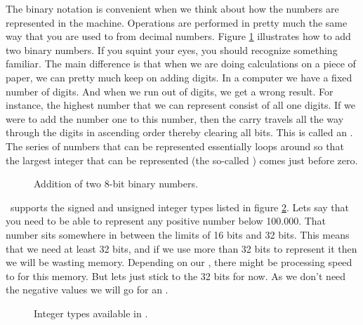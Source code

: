 
The binary notation is convenient when we think about how the numbers are represented in the machine. Operations are performed in pretty much the same way that you are used to from decimal numbers. Figure \ref{fig:prim:int:binary:add} illustrates how to add two binary numbers. If you squint your eyes, you should recognize something familiar. The main difference is that when we are doing calculations on a piece of paper, we can pretty much keep on adding digits. In a computer we have a fixed number of digits. And when we run out of digits, we get a wrong result. For instance, the highest number that we can represent consist of all one digits. If we were to add the number one to this number, then the carry travels all the way through the digits in ascending order thereby clearing all bits. This is called an . The series of numbers that can be represented essentially loops around so that the largest integer that can be represented (the so-called ) comes just before zero.

\begin{figure}[tbp]
  
  \caption{Addition of two 8-bit binary numbers.}
  \label{fig:prim:int:binary:add}
\end{figure}


\csharpsubsection{\csharp}

\csharp\ supports the signed and unsigned integer types listed in figure \ref{fig:prim:int:csharp:types}. Lets say that you need to be able to represent any positive number below 100.000. That number sits somewhere in between the limits of 16 bits and 32 bits. This means that we need at least 32 bits, and if we use more than 32 bits to represent it then we will be wasting memory. Depending on our , there might be processing speed to  for this  memory. But lets just stick to the 32 bits for now. As we don't need the negative values we will go for an .

\begin{figure}[tbp]
  
  \caption{Integer types available in \csharp.}
  \label{fig:prim:int:csharp:types}
\end{figure}

